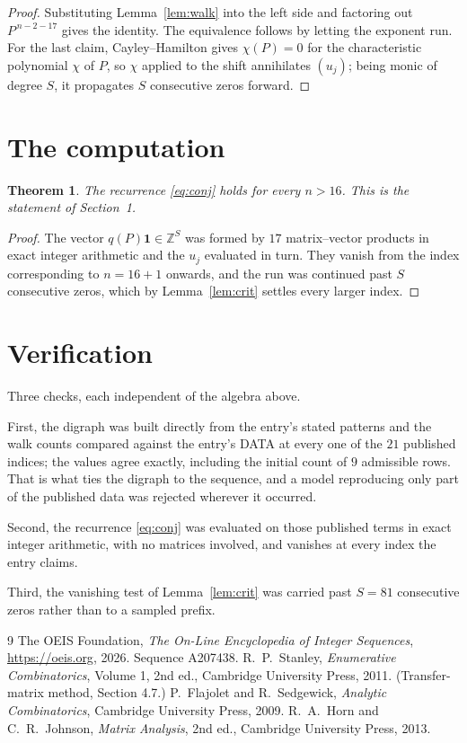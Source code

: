\documentclass[11pt,a4paper]{article}
\theoremstyle{plain}
\newtheorem{theorem}{Theorem}
\theoremstyle{definition}
\begin{document}
\begin{proof}
Substituting Lemma~\ref{lem:walk} into the left side and factoring out
$P^{\,n-2-17}$ gives the identity. The equivalence follows by letting the exponent
run. For the last claim, Cayley--Hamilton gives $\chi(P)=0$ for the characteristic
polynomial $\chi$ of $P$, so $\chi$ applied to the shift annihilates $(u_j)$; being monic of
degree $S$, it propagates $S$ consecutive zeros forward.
\end{proof}

\section{The computation}

\begin{theorem}
The recurrence \eqref{eq:conj} holds for every $n>16$. This is the statement of
Section~1.
\end{theorem}

\begin{proof}
The vector $q(P)\mathbf{1}\in\mathbb{Z}^{S}$ was formed by $17$ matrix--vector
products in exact integer arithmetic and the $u_j$ evaluated in turn. They vanish from the
index corresponding to $n=16+1$ onwards, and the run was continued past $S$ consecutive
zeros, which by Lemma~\ref{lem:crit} settles every larger index.
\end{proof}

\section{Verification}

Three checks, each independent of the algebra above.

First, the digraph was built directly from the entry's stated patterns and the walk counts
compared against the entry's DATA at every one of the $21$ published indices; the
values agree exactly, including the initial count of $9$ admissible rows. That is
what ties the digraph to the sequence, and a model reproducing only part of the published
data was rejected wherever it occurred.

Second, the recurrence \eqref{eq:conj} was evaluated on those published terms in exact
integer arithmetic, with no matrices involved, and vanishes at every index the entry claims.

Third, the vanishing test of Lemma~\ref{lem:crit} was carried past $S=81$ consecutive
zeros rather than to a sampled prefix.

\begin{thebibliography}{9}
 The OEIS Foundation, \emph{The On-Line Encyclopedia of Integer
Sequences}, \url{https://oeis.org}, 2026. Sequence A207438.
 R.~P.~Stanley, \emph{Enumerative Combinatorics}, Volume 1, 2nd ed.,
Cambridge University Press, 2011. (Transfer-matrix method, Section 4.7.)
 P.~Flajolet and R.~Sedgewick, \emph{Analytic Combinatorics}, Cambridge
University Press, 2009.
 R.~A.~Horn and C.~R.~Johnson, \emph{Matrix Analysis}, 2nd ed., Cambridge
University Press, 2013.
\end{thebibliography}
\end{document}
